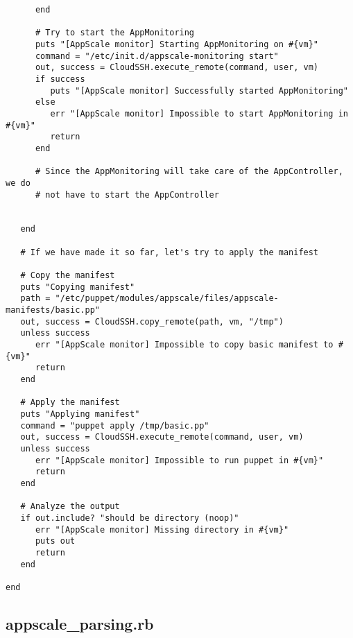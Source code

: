 \begin{lstlisting}
      end
      
      # Try to start the AppMonitoring
      puts "[AppScale monitor] Starting AppMonitoring on #{vm}"
      command = "/etc/init.d/appscale-monitoring start"
      out, success = CloudSSH.execute_remote(command, user, vm)
      if success
         puts "[AppScale monitor] Successfully started AppMonitoring"
      else
         err "[AppScale monitor] Impossible to start AppMonitoring in #{vm}"
         return
      end
      
      # Since the AppMonitoring will take care of the AppController, we do
      # not have to start the AppController
      
      
   end
   
   # If we have made it so far, let's try to apply the manifest
   
   # Copy the manifest
   puts "Copying manifest"
   path = "/etc/puppet/modules/appscale/files/appscale-manifests/basic.pp"
   out, success = CloudSSH.copy_remote(path, vm, "/tmp")
   unless success
      err "[AppScale monitor] Impossible to copy basic manifest to #{vm}"
      return
   end
   
   # Apply the manifest
   puts "Applying manifest"
   command = "puppet apply /tmp/basic.pp"
   out, success = CloudSSH.execute_remote(command, user, vm)
   unless success
      err "[AppScale monitor] Impossible to run puppet in #{vm}"
      return
   end
   
   # Analyze the output
   if out.include? "should be directory (noop)"
      err "[AppScale monitor] Missing directory in #{vm}"
      puts out
      return
   end
   
end
\end{lstlisting}


\subsection{appscale\_parsing.rb}


